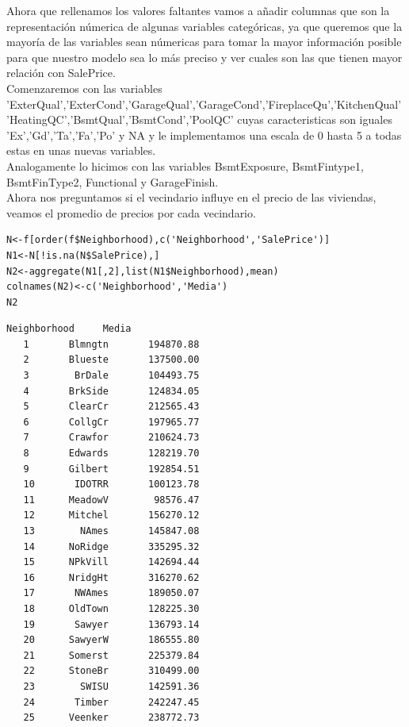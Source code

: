 \documentclass{report}
\begin{document}
\begin{itemize}
Ahora que rellenamos los valores faltantes vamos a añadir columnas que son la representación númerica de algunas variables categóricas, ya que queremos que la mayoría de las variables sean númericas para tomar la mayor información posible para que nuestro modelo sea lo más preciso y ver cuales son las que tienen mayor relación con SalePrice.\\

Comenzaremos con las variables 'ExterQual','ExterCond','GarageQual','GarageCond','FireplaceQu','KitchenQual' 'HeatingQC','BsmtQual','BsmtCond','PoolQC' cuyas caracteristicas son iguales 'Ex','Gd','Ta','Fa','Po' y NA y le implementamos una escala de 0 hasta 5 a todas estas en unas nuevas variables.\\

Analogamente lo hicimos con las variables BsmtExposure, BsmtFintype1, BsmtFinType2, Functional y GarageFinish.\\

Ahora nos preguntamos si el vecindario influye en el precio de las viviendas, veamos el promedio de precios por cada vecindario.\\

\begin{lstlisting}[frame=single]
N<-f[order(f$Neighborhood),c('Neighborhood','SalePrice')]
N1<-N[!is.na(N$SalePrice),]
N2<-aggregate(N1[,2],list(N1$Neighborhood),mean)
colnames(N2)<-c('Neighborhood','Media')
N2
\end{lstlisting}

\begin{lstlisting}[frame=single]
          Neighborhood     Media
   1       Blmngtn       194870.88
   2       Blueste       137500.00
   3        BrDale       104493.75
   4       BrkSide       124834.05
   5       ClearCr       212565.43
   6       CollgCr       197965.77
   7       Crawfor       210624.73
   8       Edwards       128219.70
   9       Gilbert       192854.51
   10       IDOTRR       100123.78
   11      MeadowV        98576.47
   12      Mitchel       156270.12
   13        NAmes       145847.08
   14      NoRidge       335295.32
   15      NPkVill       142694.44
   16      NridgHt       316270.62
   17       NWAmes       189050.07
   18      OldTown       128225.30
   19       Sawyer       136793.14
   20      SawyerW       186555.80
   21      Somerst       225379.84
   22      StoneBr       310499.00
   23        SWISU       142591.36
   24       Timber       242247.45
   25      Veenker       238772.73
\end{lstlisting}


\end{itemize}
\end{document}

